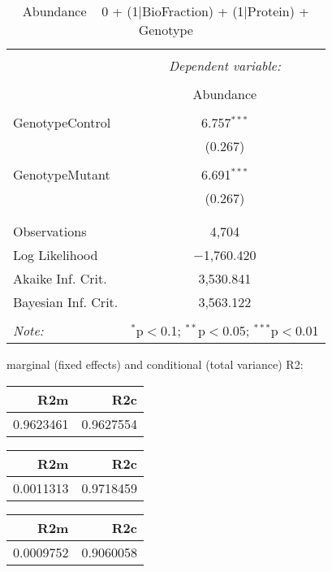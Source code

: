 \documentclass[11pt]{report}
\begin{document}
\begin{table}[!htbp] \centering 
  \caption{Abundance ~ 0 + (1|BioFraction) + (1|Protein) + Genotype} 
  \label{} 
\begin{tabular}{@{\extracolsep{5pt}}lc} 
\\[-1.8ex]\hline 
\hline \\[-1.8ex] 
 & \multicolumn{1}{c}{\textit{Dependent variable:}} \\ 
\cline{2-2} 
\\[-1.8ex] & Abundance \\ 
\hline \\[-1.8ex] 
 GenotypeControl & 6.757$^{***}$ \\ 
  & (0.267) \\ 
  & \\ 
 GenotypeMutant & 6.691$^{***}$ \\ 
  & (0.267) \\ 
  & \\ 
\hline \\[-1.8ex] 
Observations & 4,704 \\ 
Log Likelihood & $-$1,760.420 \\ 
Akaike Inf. Crit. & 3,530.841 \\ 
Bayesian Inf. Crit. & 3,563.122 \\ 
\hline 
\hline \\[-1.8ex] 
\textit{Note:}  & \multicolumn{1}{r}{$^{*}$p$<$0.1; $^{**}$p$<$0.05; $^{***}$p$<$0.01} \\ 
\end{tabular} 
\end{table} 
marginal (fixed effects) and conditional (total variance) R2:

\begin{tabular}{r|r}
\hline
R2m & R2c\\
\hline
0.9623461 & 0.9627554\\
\hline
\end{tabular}

\begin{tabular}{r|r}
\hline
R2m & R2c\\
\hline
0.0011313 & 0.9718459\\
\hline
\end{tabular}

\begin{tabular}{r|r}
\hline
R2m & R2c\\
\hline
0.0009752 & 0.9060058\\
\hline
\end{tabular}
\end{document}
